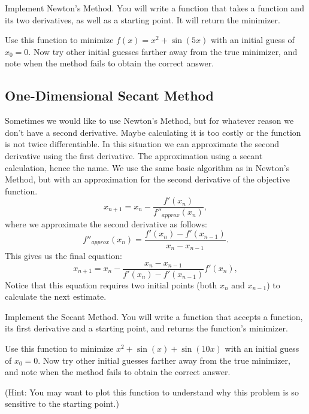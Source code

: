 \begin{problem}
Implement Newton's Method.
You will write a function that takes a function and its two derivatives, as well as a starting point.
It will return the minimizer.

Use this function to minimize $f(x) = x^2 + \sin(5x)$ with an initial guess of $x_0 = 0$.
Now try other initial guesses farther away from the true minimizer, and note when the method fails to obtain the correct answer.
\end{problem}

\subsection*{One-Dimensional Secant Method}
Sometimes we would like to use Newton's Method, but for whatever reason we don't have a second derivative.
Maybe calculating it is too costly or the function is not twice differentiable.
In this situation we can approximate the second derivative using the first derivative.
The approximation using a secant calculation, hence the name.
We use the same basic algorithm as in Newton's Method, but with an approximation for the second derivative of the objective function.
\begin{equation*}
x_{n+1} = x_n - \frac{f'(x_n)}{f''_{approx}(x_n)},
\end{equation*}
where we approximate the second derivative as follows:
\begin{equation*}
f''_{approx}(x_n) = \frac{f'(x_n) - f'(x_{n-1})}{x_n - x_{n-1}}.
\end{equation*}
This gives us the final equation:
\begin{equation*}
x_{n+1} = x_n - \frac{x_n - x_{n-1}}{f'(x_n) - f'(x_{n-1})}f'(x_n),
\end{equation*}
Notice that this equation requires two initial points (both $x_n$ and $x_{n-1}$) to calculate the next estimate.

\begin{problem}
Implement the Secant Method.
You will write a function that accepts a function, its first derivative and a starting point, and returns the function's minimizer.

Use this function to minimize $x^2 + \sin(x) + \sin(10x)$ with an initial guess of $x_0 = 0$.
Now try other initial guesses farther away from the true minimizer, and note when the method fails to obtain the correct answer.

(Hint: You may want to plot this function to understand why this problem is so sensitive to the starting point.)
\end{problem}

